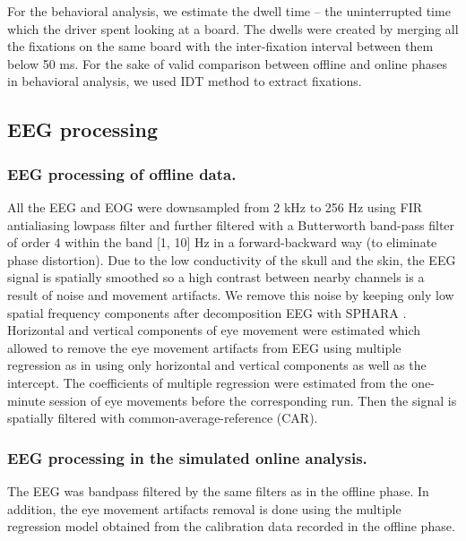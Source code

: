 \documentclass[12pt]{iopart}
\begin{document}
For the behavioral analysis, we estimate 
the dwell time -- the uninterrupted time which the driver spent looking at a board.
The dwells were created
by merging all the fixations on the same board with the inter-fixation interval 
between them below 50 ms.
For the sake of valid comparison between offline and online phases 
in behavioral analysis, we used IDT method to extract fixations.



\subsection{EEG processing}
\subsubsection*{EEG processing of offline data.}
All the EEG and EOG were downsampled from 2 kHz to 256 Hz
using FIR antialiasing lowpass filter
and further filtered  with a Butterworth band-pass filter
of order 4 within the band [1, 10] Hz  in a forward-backward way (to eliminate phase distortion).
Due to the low conductivity of the skull and the skin,
the EEG signal is spatially smoothed so a high contrast between nearby channels
is a result of noise and movement artifacts. We remove this noise
by keeping only low spatial frequency components after decomposition EEG with SPHARA \cite{graichen_sphara_2015}.
Horizontal and vertical components of eye movement were estimated which allowed
to remove the eye movement artifacts from EEG using multiple regression 
as in \cite{schlogl_fully_2007} using only horizontal and vertical 
components as well as the intercept.
The coefficients of multiple regression were estimated from the 
one-minute session of eye movements before the corresponding run.
Then the signal is spatially
filtered with common-average-reference (CAR). 

\subsubsection*{EEG processing in the simulated online analysis.}
The EEG was  bandpass filtered by the same filters as in the offline phase. In addition, the eye movement artifacts removal is done using the multiple regression model obtained from the calibration data recorded in the offline phase.
\end{document}
